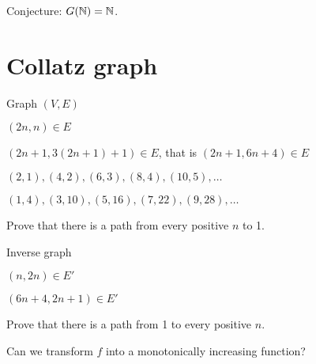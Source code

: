 Conjecture: \(G(\mathbb{N}) = \mathbb{N}\).

\section{Collatz graph}

Graph \((V,E)\)

\((2n,n) \in E\)

\((2n+1,3(2n+1)+1) \in E\), that is
\((2n+1,6n+4) \in E\)

\((2,1),(4,2),(6,3),(8,4),(10,5),\ldots\)

\((1,4),(3,10),(5,16),(7,22),(9,28),\ldots\)

Prove that there is a path from every positive \(n\) to 1.

Inverse graph

\((n,2n) \in E'\)

\((6n+4,2n+1) \in E'\)

Prove that there is a path from 1 to every positive \(n\).

Can we transform \(f\) into a monotonically increasing function?
